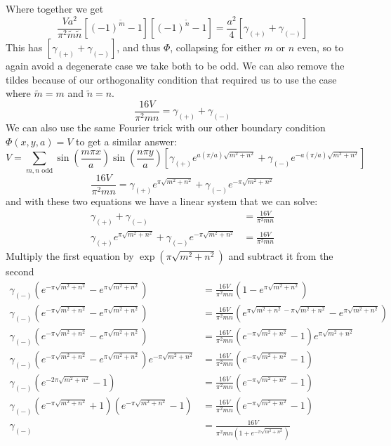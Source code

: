 \documentclass{article}
\begin{document}
Where together we get
\[ \frac{Va^{2}}{\pi^{2}\tilde{m}\tilde{n}} [ (-1)^{\tilde{m}} - 1 ] [ (-1)^{\tilde{n}} - 1 ] = \frac{a^{2}}{4}\left[ \gamma_{(+)}+\gamma_{(-)} \right] \]
This has $\left[ \gamma_{(+)}+\gamma_{(-)} \right]$, and thus $\Phi$, collapsing for either $m$ or $n$ even, so to again avoid a degenerate case we take both to be odd. We can also remove the tildes because of our orthogonality condition that required us to use the case where $\tilde{m}=m$ and $\tilde{n}=n$.
\[ \frac{16V}{\pi^{2}mn} = \gamma_{(+)}+\gamma_{(-)} \]
We can also use the same Fourier trick with our other boundary condition $\Phi(x,y,a)=V$ to get a similar answer:
\[ V = \sum_{m,n \text{ odd}} \sin\left(\frac{ m\pi x }{ a }\right) \sin\left(\frac{ n\pi y }{ a }\right) \left[ \gamma_{(+)}e^{a(\pi/a)\sqrt{m^{2} + n^{2}}}+\gamma_{(-)}e^{-a(\pi/a)\sqrt{m^{2} + n^{2}}} \right] \]
\[ \frac{16V}{\pi^{2}mn} = \gamma_{(+)}e^{\pi\sqrt{m^{2} + n^{2}}}+\gamma_{(-)}e^{-\pi\sqrt{m^{2} + n^{2}}} \]
and with these two equations we have a linear system that we can solve:
\begin{align*}
\gamma_{(+)}+\gamma_{(-)} &= \frac{16V}{\pi^{2}mn}\\
\gamma_{(+)}e^{\pi\sqrt{m^{2} + n^{2}}}+\gamma_{(-)}e^{-\pi\sqrt{m^{2} + n^{2}}} &= \frac{16V}{\pi^{2}mn}
\end{align*}
Multiply the first equation by $\exp\left(\pi\sqrt{m^{2} + n^{2}}\right)$ and subtract it from the second
\begin{align*}
\gamma_{(-)}\left( e^{-\pi\sqrt{m^{2} + n^{2}}} - e^{\pi\sqrt{m^{2} + n^{2}}} \right) &= \frac{16V}{\pi^{2}mn} \left( 1 - e^{\pi\sqrt{m^{2} + n^{2}}} \right)\\
\gamma_{(-)}\left( e^{-\pi\sqrt{m^{2} + n^{2}}} - e^{\pi\sqrt{m^{2} + n^{2}}} \right) &= \frac{16V}{\pi^{2}mn} \left( e^{\pi\sqrt{m^{2} + n^{2}} - \pi\sqrt{m^{2} + n^{2}}} - e^{\pi\sqrt{m^{2} + n^{2}}} \right)\\
\gamma_{(-)}\left( e^{-\pi\sqrt{m^{2} + n^{2}}} - e^{\pi\sqrt{m^{2} + n^{2}}} \right) &= \frac{16V}{\pi^{2}mn} \left( e^{-\pi\sqrt{m^{2} + n^{2}}} - 1 \right)  e^{\pi\sqrt{m^{2} + n^{2}}}\\
\gamma_{(-)}\left( e^{-\pi\sqrt{m^{2} + n^{2}}} - e^{\pi\sqrt{m^{2} + n^{2}}} \right) e^{-\pi\sqrt{m^{2} + n^{2}}} &= \frac{16V}{\pi^{2}mn} \left( e^{-\pi\sqrt{m^{2} + n^{2}}} - 1 \right) \\
\gamma_{(-)}\left( e^{-2\pi\sqrt{m^{2} + n^{2}}} - 1 \right) &= \frac{16V}{\pi^{2}mn} \left( e^{-\pi\sqrt{m^{2} + n^{2}}} - 1 \right) \\
\gamma_{(-)}\left( e^{-\pi\sqrt{m^{2} + n^{2}}} + 1 \right) \left( e^{-\pi\sqrt{m^{2} + n^{2}}} - 1 \right) &= \frac{16V}{\pi^{2}mn} \left( e^{-\pi\sqrt{m^{2} + n^{2}}} - 1 \right) \\
\gamma_{(-)}  &= \frac{16V}{\pi^{2}mn \left( 1 + e^{-\pi\sqrt{m^{2} + n^{2}}} \right) } \\
\end{align*}
\end{document}
